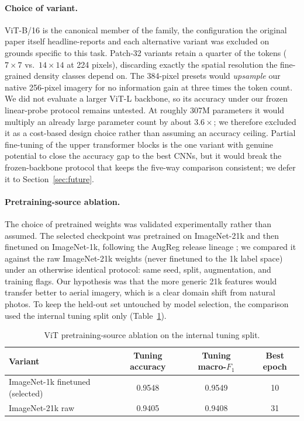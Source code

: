 \documentclass[11pt,twoside,a4paper]{article}
\begin{document}
\paragraph{Choice of variant.}
ViT-B/16 is the canonical member of the family, the configuration the
original paper itself headline-reports \cite{Dosovitskiy2021} and each
alternative variant was excluded on grounds specific to this task. Patch-32
variants retain a quarter of the tokens ($7\times7$ vs.\ $14\times14$ at
224 pixels), discarding exactly the spatial resolution the fine-grained
density classes depend on. The 384-pixel presets would \emph{upsample} our
native 256-pixel imagery for no information gain at three times the token
count. We did not evaluate a larger ViT-L backbone, so its accuracy under our
frozen linear-probe protocol remains untested. At roughly 307M parameters it
would multiply an already large parameter count by about $3.6\times$; we
therefore excluded it as a cost-based design choice rather than assuming an
accuracy ceiling. Partial fine-tuning of the upper
transformer blocks is the one variant with genuine potential to close the
accuracy gap to the best CNNs, but it would break the frozen-backbone
protocol that keeps the five-way comparison consistent; we defer it to
Section~\ref{sec:future}.

\paragraph{Pretraining-source ablation.}
\label{sec:vit-ablation}
The choice of pretrained weights was validated experimentally rather than
assumed. The selected checkpoint was pretrained on ImageNet-21k and then
finetuned on ImageNet-1k, following the AugReg release lineage
\cite{Steiner2022}; we compared it against the raw ImageNet-21k
weights (never finetuned to the 1k label space) under an otherwise identical
protocol: same seed, split, augmentation, and training flags. Our
hypothesis was that the more generic 21k features would transfer better to
aerial imagery, which is a clear domain shift from natural photos. To keep
the held-out set untouched by model selection, the comparison used the
internal tuning split only (Table~\ref{tab:vit-ablation}).

\begin{table}[H]
\centering
\caption{ViT pretraining-source ablation on the internal tuning split.}
\label{tab:vit-ablation}
\small
\begin{tabular}{lccc}
\toprule
Variant & Tuning accuracy & Tuning macro-$F_1$ & Best epoch \\
\midrule
ImageNet-1k finetuned (selected) & 0.9548 & 0.9549 & 10 \\
ImageNet-21k raw                 & 0.9405 & 0.9408 & 31 \\
\bottomrule
\end{tabular}
\end{table}
\end{document}

